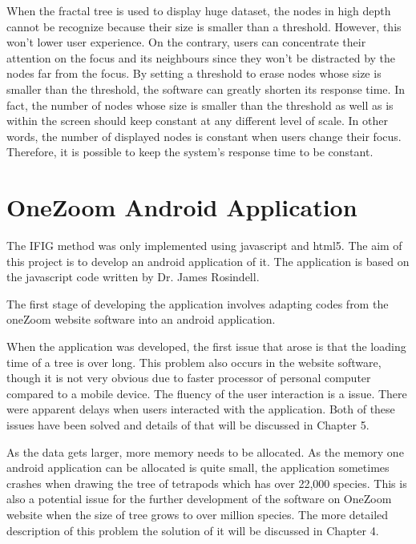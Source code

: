 \documentclass[a4paper,11pt,twoside]{report}
\begin{document}
When the fractal tree is used to display huge dataset, the nodes in high depth cannot be recognize because their size is smaller than a threshold. However, this won't lower user experience. On the contrary, users can concentrate their attention on the focus and its neighbours since they won't be distracted by the nodes far from the focus. By setting a threshold to erase nodes whose size is smaller than the threshold, the software can greatly shorten its response time. In fact, the number of nodes whose size is smaller than the threshold as well as is within the screen should keep constant at any different level of scale. In other words, the number of displayed nodes is constant when users change their focus. Therefore, it is possible to keep the system's response time to be constant.\cite{fractalMath}



\section{OneZoom Android Application}

The IFIG method was only implemented using javascript and html5. The aim of this project is to develop an android application of it. The application is based on the javascript code written by Dr. James Rosindell. 

The first stage of developing the application involves adapting codes from the oneZoom website software into an android application.

When the application was developed, the first issue that arose is that the loading time of a tree is over long. This problem also occurs in the website software, though it is not very obvious due to faster processor of personal computer compared to a mobile device. The fluency of the user interaction is a issue. There were apparent delays when users interacted with the application. Both of these issues have been solved and details of that will be discussed in Chapter 5.

As the data gets larger, more memory needs to be allocated. As the memory one android application can be allocated is quite small, the application sometimes crashes when drawing the tree of tetrapods which has over 22,000 species. This is also a potential issue for the further development of the software on OneZoom website when the size of tree grows to over million species. The more detailed description of this problem the solution of it will be discussed in Chapter 4.
\end{document}

